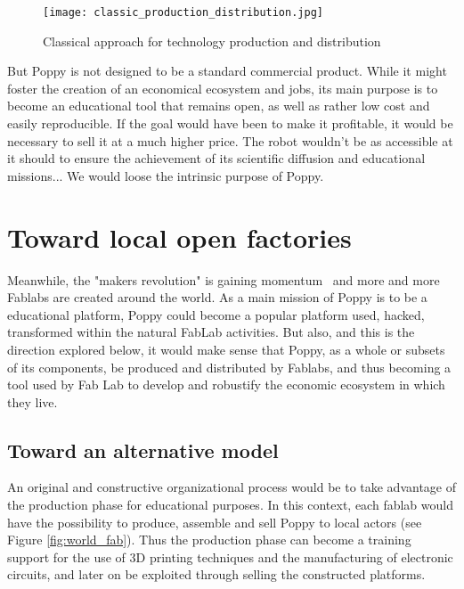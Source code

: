 \begin{figure}[h]
    \begin{center}
        \texttt{[image: classic\_production\_distribution.jpg]}
    \end{center}
    \caption{Classical approach for technology production and distribution}
    \label{fig:classic}
\end{figure}


But Poppy is not designed to be a standard commercial product. While it might foster the creation of an economical ecosystem and jobs, its main purpose is to become an educational tool that remains open, as well as rather low cost and easily reproducible. If the goal would have been to make it profitable, it would be necessary to sell it at a much higher price. The robot wouldn't be as accessible at it should to ensure the achievement of its scientific diffusion and educational missions... We would loose the intrinsic purpose of Poppy.

\section{Toward local open factories } %

Meanwhile, the "makers revolution" is gaining momentum~\parencite{anderson2012makers} and more and more Fablabs are created around the world. As a main mission of Poppy is to be a educational platform, Poppy could become a popular platform used, hacked, transformed within the natural FabLab activities. But also, and this is the direction explored below,  it would make sense that Poppy, as a whole or subsets of its components, be produced and distributed by Fablabs, and thus becoming a tool used by Fab Lab to develop and robustify the economic ecosystem in which they live.

\subsection{Toward an alternative model} %

An original and constructive organizational process would be to take advantage of the production phase for educational purposes. In this context, each fablab would have the possibility to produce, assemble and sell Poppy to local actors (see Figure \ref{fig:world_fab}). Thus the production phase can become a training support for the use of 3D printing techniques and the manufacturing of electronic circuits, and later on be exploited through selling the constructed platforms.



